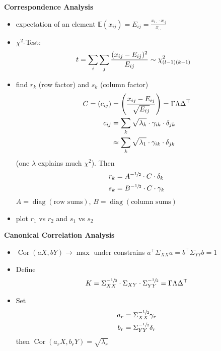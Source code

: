 \documentclass[10pt,landscape,a4paper]{article}
\newcommand{\E}{\mathbb{E}}
\DeclareMathOperator{\Cor}{Cor}
\DeclareMathOperator{\diag}{diag}
\begin{document}
\begin{multicols*}{4}
\begin{center}
	\normalsize{\textbf{Correspondence Analysis}} \\
\end{center}
\begin{itemize}
	\item expectation of an element $\E(x_{ij}) = E_{ij} = \frac{x_{i\cdot} \cdot x_{\cdot j}}{x_{\cdot\cdot}}$
	\item $\chi^2$-Test:
	\begin{align}
		t &= \sum_i\sum_j \frac{(x_{ij} - E_{ij})^2}{E_{ij}} \sim \chi^2_{(l-1)(k-1)} \notag
	\end{align}
	\item find $r_k$ (row factor) and $s_k$ (column factor)
	\begin{align}
		C = (c_{ij}) &= \left(\frac{x_{ij} - E_{ij}}{\sqrt{E_{ij}}}\right) = \Gamma\Lambda\Delta^\top \notag \\
		c_{ij} &= \sum_k \sqrt{\lambda_k}\cdot \gamma_{ik}\cdot\delta_{jk} \notag \\
		&\approx \sum_k \sqrt{\lambda_1}\cdot \gamma_{ik}\cdot\delta_{jk} \notag
	\end{align}
	(one $\lambda$ explains much $\chi^2$). Then
	\begin{align}
		r_k &= A^{-\sfrac{1}{2}}\cdot C\cdot \delta_k \notag \\
		s_k &= B^{-\sfrac{1}{2}}\cdot C\cdot \gamma_k \notag
	\end{align}
	$A = \diag(\text{row sums})$, $B = \diag(\text{column sums})$
	\item plot $r_1$ vs $r_2$ and $s_1$ vs $s_2$
\end{itemize}

\begin{center}
	\normalsize{\textbf{Canonical Correlation Analysis}} \\
\end{center}
\begin{itemize}
	\item $\Cor(aX,bY) \to\max$ under constrains $a^\top\Sigma_{XX}a = b^\top\Sigma_{YY}b = 1$
	\item Define
	\begin{align}
		K = \Sigma_{XX}^{-\sfrac{1}{2}}\cdot\Sigma_{XY}\cdot\Sigma_{YY}^{-\sfrac{1}{2}} = \Gamma\Lambda\Delta^\top \notag
	\end{align}
	\item Set
	\begin{align}
		a_r &= \Sigma_{XX}^{-\sfrac{1}{2}}\gamma_r \notag \\
		b_r &= \Sigma_{YY}^{-\sfrac{1}{2}}\delta_r \notag
	\end{align}
	then $\Cor(a_rX,b_rY) = \sqrt{\lambda_r}$
\end{itemize}


\end{multicols*}
\end{document}
